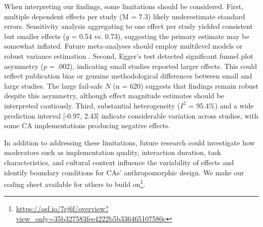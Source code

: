 \documentclass[manuscript,anonymous,sigconf]{acmart}
\begin{document}
When interpreting our findings, some limitations should be considered. First, multiple dependent effects per study (M = 7.3) likely underestimate standard errors. Sensitivity analysis aggregating to one effect per study yielded consistent but smaller effects ($g$ = 0.54 vs. 0.73), suggesting the primary estimate may be somewhat inflated. Future meta-analyses should employ multilevel models \cite{vandennoortgate2013} or robust variance estimation \cite{hedges2010}. Second, Egger's test detected significant funnel plot asymmetry ($p$ = .002), indicating small studies reported larger effects. This could reflect publication bias or genuine methodological differences between small and large studies. The large fail-safe $N$ (n = 620) suggests that findings remain robust despite this asymmetry, although effect magnitude estimates should be interpreted cautiously. Third, substantial heterogeneity ($I^2$ = 95.4\%) and a wide prediction interval [-0.97, 2.43] indicate considerable variation across studies, with some CA implementations producing negative effects. 

In addition to addressing these limitations, future research could investigate how moderators such as implementation quality, interaction duration, task characteristics, and cultural context influence the variability of effects and identify boundary conditions for CAs' anthropomorphic design. We make our coding sheet available for others to build on\footnote{\href{https://osf.io/7rj6f/overview?view_only=35b327583fee4222b5b336465107580c}{https://osf.io/7rj6f/overview?view\_only=35b327583fee4222b5b336465107580c}}.


\end{document}
